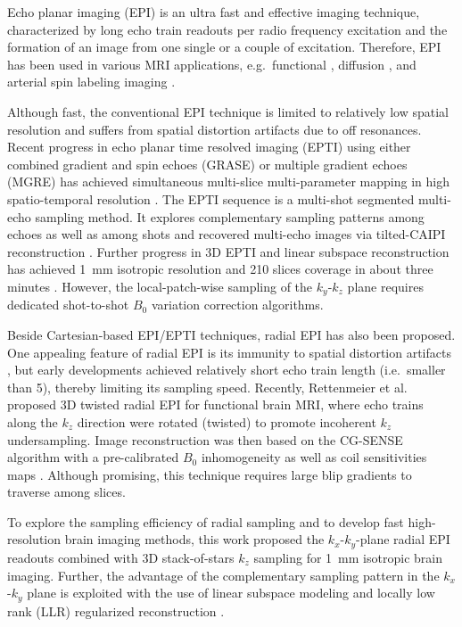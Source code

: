 \documentclass[a4paper,11pt]{article}
\begin{document}
Echo planar imaging (EPI) \cite{mansfield_1977_epi} is
an ultra fast and effective imaging technique,
characterized by long echo train readouts per radio frequency excitation and
the formation of an image from one single or a couple of excitation.
Therefore, EPI has been used in various MRI applications,
e.g.~functional \cite{ogawa_1990_fmri}, diffusion \cite{lebihan_1986_diff},
and arterial spin labeling imaging \cite{feinberg_2013_asl}.

Although fast, the conventional EPI technique is limited to relatively
low spatial resolution and suffers from spatial distortion artifacts
due to off resonances.
Recent progress in echo planar time resolved imaging (EPTI)
using either combined gradient and spin echoes (GRASE)
or multiple gradient echoes (MGRE) has achieved simultaneous
multi-slice multi-parameter mapping in high spatio-temporal resolution
\cite{wang_2019_epti}.
The EPTI sequence is a multi-shot segmented multi-echo sampling method.
It explores complementary sampling patterns
among echoes as well as among shots and recovered multi-echo images
via tilted-CAIPI reconstruction \cite{dong_2019_tilted_capi}.
Further progress in 3D EPTI and linear subspace reconstruction
has achieved \SI{1}{\mm} isotropic resolution and 210 slices coverage
in about three minutes \cite{dong_2021_vfa_epti}.
However, the local-patch-wise sampling of the $k_y$-$k_z$ plane
requires dedicated shot-to-shot $B_0$ variation correction algorithms.

Beside Cartesian-based EPI/EPTI techniques,
radial EPI has also been proposed.
One appealing feature of radial EPI is its immunity to
spatial distortion artifacts \cite{silva_1998_repi},
but early developments
\cite{seifert_2000_rtse,theilmann_2004_vo_rfse,jung_2009_rssfp,lee_2010_repi,bhat_2011_repi_heart}
achieved relatively short echo train length (i.e.~smaller than 5),
thereby limiting its sampling speed.
Recently, Rettenmeier et al.~\cite{rettenmeier_2021_repi} proposed 3D
twisted radial EPI for functional brain MRI,
where echo trains along the $k_z$ direction were rotated (twisted)
to promote incoherent $k_z$ undersampling.
Image reconstruction was then based on
the CG-SENSE algorithm \cite{pruessmann_2001_gsense} with a pre-calibrated
$B_0$ inhomogeneity \cite{funai_2008_secondorder} as well as
coil sensitivities maps \cite{walsh_2000_coil}.
Although promising, this technique requires
large blip gradients to traverse among slices.

To explore the sampling efficiency of radial sampling
and to develop fast high-resolution brain imaging methods,
this work proposed the $k_x$-$k_y$-plane radial EPI readouts
\cite{tan_2016_phd,tan_2019_mobawf}
combined with 3D stack-of-stars $k_z$ sampling \cite{block_2014_rad}
for \SI{1}{\mm} isotropic brain imaging.
Further, the advantage of the complementary sampling pattern
in the $k_x$-$k_y$ plane is exploited
with the use of
linear subspace modeling \cite{huang_2012_t2basis,tamir_2017_t2shuffling}
and locally low rank (LLR) regularized reconstruction \cite{zhang_2015_llr}.
\end{document}
